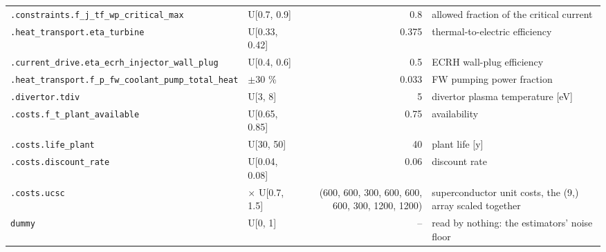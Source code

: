 \begin{tabular}{llrl}
\texttt{.constraints.f\_j\_tf\_wp\_critical\_max} & U[0.7, 0.9] & 0.8 & allowed fraction of the critical current \\
\texttt{.heat\_transport.eta\_turbine} & U[0.33, 0.42] & 0.375 & thermal-to-electric efficiency \\
\texttt{.current\_drive.eta\_ecrh\_injector\_wall\_plug} & U[0.4, 0.6] & 0.5 & ECRH wall-plug efficiency \\
\texttt{.heat\_transport.f\_p\_fw\_coolant\_pump\_total\_heat} & $\pm$30 \% & 0.033 & FW pumping power fraction \\
\texttt{.divertor.tdiv} & U[3, 8] & 5 & divertor plasma temperature [eV] \\
\texttt{.costs.f\_t\_plant\_available} & U[0.65, 0.85] & 0.75 & availability \\
\texttt{.costs.life\_plant} & U[30, 50] & 40 & plant life [y] \\
\texttt{.costs.discount\_rate} & U[0.04, 0.08] & 0.06 & discount rate \\
\texttt{.costs.ucsc} & $\times$ U[0.7, 1.5] & (600, 600, 300, 600, 600, 600, 300, 1200, 1200) & superconductor unit costs, the (9,) array scaled together \\
\texttt{dummy} & U[0, 1] & -- & read by nothing: the estimators' noise floor \\
\bottomrule
\end{tabular}
